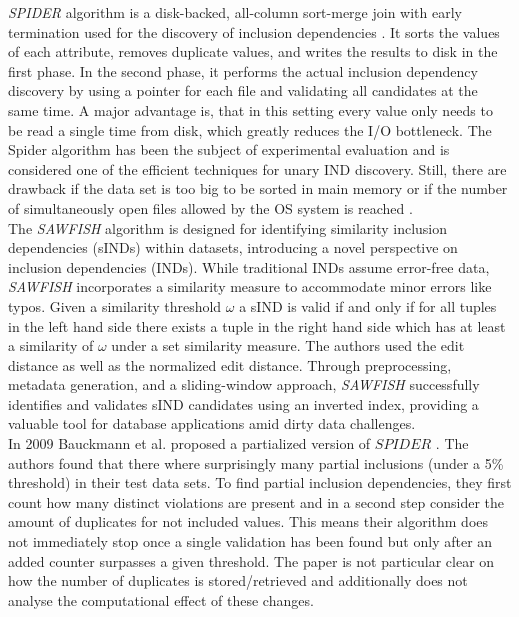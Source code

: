 \textit{SPIDER} algorithm is a disk-backed, all-column sort-merge join with early termination used for the discovery of inclusion dependencies \cite{bauckmann2006efficiently}. It sorts the values of each attribute, removes duplicate values, and writes the results to disk in the first phase. In the second phase, it performs the actual inclusion dependency discovery by using a pointer for each file and validating all candidates at the same time. A major advantage is, that in this setting every value only needs to be read a single time from disk, which greatly reduces the I/O bottleneck. The Spider algorithm has been the subject of experimental evaluation and is considered one of the efficient techniques for unary IND discovery. Still, there are drawback if the data set is too big to be sorted in main memory or if the number of simultaneously open files allowed by the OS system is reached \cite{papenbrock2015divide}. \\

The \textit{SAWFISH} algorithm \cite{kaminsky2023discovering} is designed for identifying similarity inclusion dependencies (sINDs) within datasets, introducing a novel perspective on inclusion dependencies (INDs). While traditional INDs assume error-free data, \textit{SAWFISH} incorporates a similarity measure to accommodate minor errors like typos. Given a similarity threshold $\omega$ a sIND is valid if and only if for all tuples in the left hand side there exists a tuple in the right hand side which has at least a similarity of $\omega$ under a set similarity measure. The authors used the edit distance as well as the normalized edit distance. Through preprocessing, metadata generation, and a sliding-window approach, \textit{SAWFISH} successfully identifies and validates sIND candidates using an inverted index, providing a valuable tool for database applications amid dirty data challenges. \\

In 2009 Bauckmann et al. proposed a partialized version of $SPIDER$ \cite{bauckmann2006efficiently}. The authors found that there where surprisingly many partial inclusions (under a 5\% threshold) in their test data sets. To find partial inclusion dependencies, they first count how many distinct violations are present and in a second step consider the amount of duplicates for not included values. This means their algorithm does not immediately stop once a single validation has been found but only after an added counter surpasses a given threshold. The paper is not particular clear on how the number of duplicates is stored/retrieved and additionally does not analyse the computational effect of these changes.